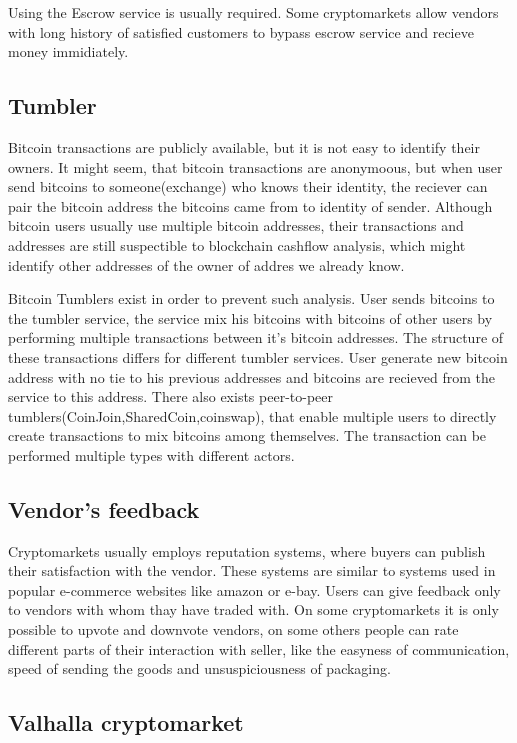 \documentclass[
  digital, %
  table,   %
  lof,     %
  lot,     %
  oneside
]{fithesis3}
\begin{document}
 Using the Escrow service is usually required.
 Some cryptomarkets allow vendors with long history of satisfied customers to bypass escrow service and recieve money immidiately.
 
\subsection{Tumbler}

Bitcoin transactions are publicly available, but it is not easy to identify their owners.
It might seem, that bitcoin transactions are anonymoous, but when user send bitcoins to
someone(exchange) who knows their identity, the reciever can pair the bitcoin address the bitcoins came from
to identity of sender. Although bitcoin users usually use multiple bitcoin addresses, their transactions and addresses are still 
suspectible to blockchain cashflow analysis, which might identify other addresses of the owner of addres we already know.

Bitcoin Tumblers exist in order to prevent such analysis. User sends bitcoins to the tumbler service, the service mix his bitcoins
with bitcoins of other users by performing multiple transactions between it's bitcoin addresses.
The structure of these transactions differs for different tumbler services.
User generate new bitcoin address with no tie to his previous addresses and bitcoins are recieved from the service to this address.
 There also exists peer-to-peer tumblers(CoinJoin,SharedCoin,coinswap),
that enable multiple users to directly create transactions to mix bitcoins among themselves.
The transaction can be performed multiple types with different actors.

\subsection{Vendor's feedback}

Cryptomarkets usually employs reputation systems, where buyers can publish their satisfaction with the vendor.
These systems are similar to systems used in popular e-commerce websites like amazon or e-bay.
Users can give feedback only to vendors with whom thay have traded with.
On some cryptomarkets it is only possible to upvote and downvote vendors, on some others people can
rate different parts of their interaction with seller, like the easyness of communication,
speed of sending the goods and unsuspiciousness of packaging.

\subsection{Valhalla cryptomarket}
\end{document}
